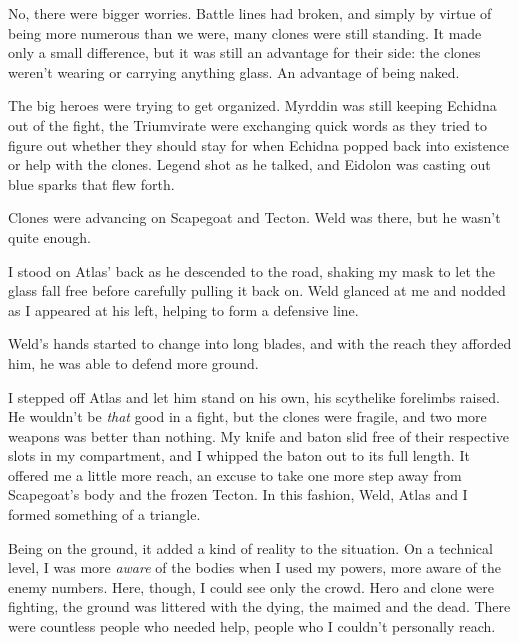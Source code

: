 No, there were bigger worries.  Battle lines had broken, and simply by virtue of being more numerous than we were, many clones were still standing.  It made only a small difference, but it was still an advantage for their side: the clones weren't wearing or carrying anything glass.  An advantage of being naked.



The big heroes were trying to get organized.  Myrddin was still keeping Echidna out of the fight, the Triumvirate were exchanging quick words as they tried to figure out whether they should stay for when Echidna popped back into existence or help with the clones.  Legend shot as he talked, and Eidolon was casting out blue sparks that flew forth.



Clones were advancing on Scapegoat and Tecton.  Weld was there, but he wasn't quite enough.



I stood on Atlas' back as he descended to the road, shaking my mask to let the glass fall free before carefully pulling it back on.  Weld glanced at me and nodded as I appeared at his left, helping to form a defensive line.



Weld's hands started to change into long blades, and with the reach they afforded him, he was able to defend more ground.



I stepped off Atlas and let him stand on his own, his scythelike forelimbs raised.  He wouldn't be \emph{that} good in a fight, but the clones were fragile, and two more weapons was better than nothing.  My knife and baton slid free of their respective slots in my compartment, and I whipped the baton out to its full length.  It offered me a little more reach, an excuse to take one more step away from Scapegoat's body and the frozen Tecton.  In this fashion, Weld, Atlas and I formed something of a triangle.



Being on the ground, it added a kind of reality to the situation.  On a technical level, I was more \emph{aware} of the bodies when I used my powers, more aware of the enemy numbers.  Here, though, I could see only the crowd.  Hero and clone were fighting, the ground was littered with the dying, the maimed and the dead.  There were countless people who needed help, people who I couldn't personally reach.



